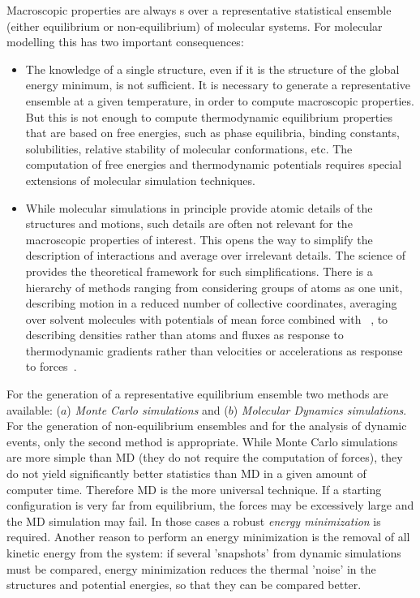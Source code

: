 Macroscopic properties are always s over a 
representative statistical ensemble (either equilibrium or 
non-equilibrium) of molecular systems. For molecular modelling this has 
two important consequences:
\begin{itemize}
\item 	The knowledge of a single structure, even if it is the structure 
	of the global energy minimum, is not sufficient. It is necessary to 
	generate a representative ensemble at a given temperature, in order to 
	compute macroscopic properties. But this is not enough to compute 
	thermodynamic equilibrium properties that are based on free energies, 
	such as phase equilibria, binding constants, solubilities,  relative 
	stability of molecular conformations, etc. The computation of free 
	energies and thermodynamic potentials requires special extensions of 
	molecular simulation techniques.
\item 	While molecular simulations in principle provide atomic details 
	of the structures and motions, such details are often not relevant for 
	the macroscopic properties of interest. This opens the way to simplify 
	the description of interactions and average over irrelevant details. 
	The science of  
	provides the theoretical framework 
	for such simplifications. There is a hierarchy of methods ranging from 
	considering groups of atoms as one unit, describing motion in a 
	reduced 
	number of collective coordinates, averaging over solvent molecules 
	with 
	potentials of mean force combined with 
	~\cite{Gunsteren90}, to {\em 
	} 
	describing densities rather than atoms and fluxes 
	as response to thermodynamic gradients rather than velocities or 
	accelerations as response to forces~\cite{Fraaije93}.
\end{itemize}

For the generation of a representative equilibrium ensemble two methods 
are available: ($a$) {\em Monte Carlo simulations} and ($b$) {\em Molecular 
Dynamics simulations}. For the generation of non-equilibrium ensembles 
and for the analysis of dynamic events, only the second method is 
appropriate. While Monte Carlo simulations are more simple than MD (they 
do not require the computation of forces), they do not yield 
significantly better statistics than MD in a given amount of computer time. 
Therefore MD is the more universal technique. If a starting 
configuration is very far from equilibrium, the forces may be 
excessively large and the MD simulation may fail. In those cases a 
robust {\em energy minimization} is required. Another reason to perform 
an energy minimization is the removal of all kinetic energy from the 
system: if several 'snapshots' from dynamic simulations must be compared, 
energy minimization reduces the thermal 'noise' in the structures and  
potential energies,  so that they can be compared better.

